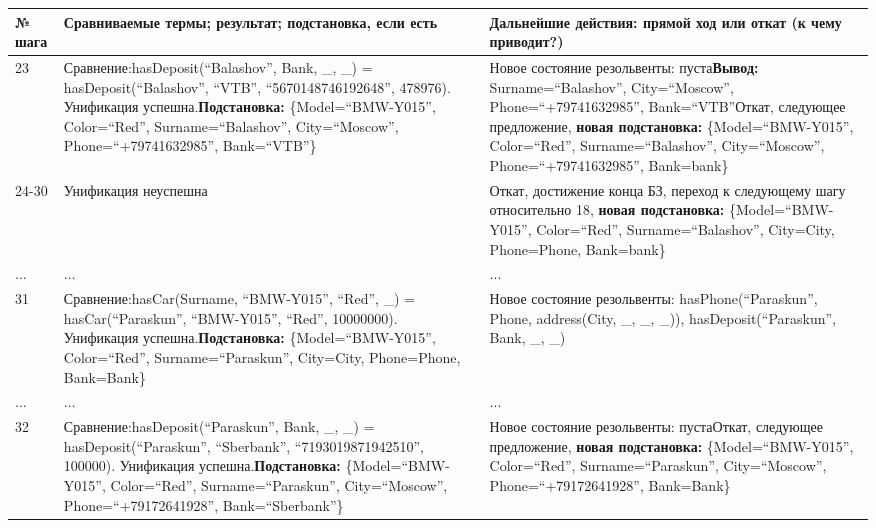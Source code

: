 \documentclass[14pt,a4paper]{scrreprt}
\begin{document}
\begin{enumerate}
\begin{table}[H]
	\centering
	\begin{tabular}{|p{1.2cm\small}|p{9cm\small}|p{5cm\small}|}
		\hline
		№ шага & Сравниваемые термы; результат; подстановка, если есть & Дальнейшие действия: прямой ход или откат (к чему приводит?)\\
		\hline
		23 & Сравнение:\linebreak hasDeposit(``Balashov'', Bank, \_, \_) = hasDeposit(``Balashov'', ``VTB'', ``5670148746192648'', 478976). Унификация успешна.\linebreak \textbf{Подстановка:} \{Model=``BMW-Y015'', Color=``Red'', Surname=``Balashov'', City=``Moscow'', Phone=``+79741632985'', Bank=``VTB''\} & Новое состояние резольвенты: пуста\linebreak \textbf{Вывод:} Surname=``Balashov'', City=``Moscow'', Phone=``+79741632985'', Bank=``VTB''\linebreak Откат, следующее предложение, \textbf{новая подстановка:} \{Model=``BMW-Y015'', Color=``Red'', Surname=``Balashov'', City=``Moscow'', Phone=``+79741632985'', Bank=bank\}\\
		\hline
		24-30 & Унификация неуспешна & Откат, достижение конца БЗ, переход к следующему шагу относительно 18, \textbf{новая подстановка:} \{Model=``BMW-Y015'', Color=``Red'', Surname=``Balashov'', City=City, Phone=Phone, Bank=bank\}\\
		\hline
		... & ... & ...\\
		\hline
		31 & Сравнение:\linebreak hasCar(Surname, ``BMW-Y015'', ``Red'', \_) = hasCar(``Paraskun'', ``BMW-Y015'', ``Red'', 10000000). Унификация успешна.\linebreak \textbf{Подстановка:} \{Model=``BMW-Y015'', Color=``Red'', Surname=``Paraskun'', City=City, Phone=Phone, Bank=Bank\} & Новое состояние резольвенты: hasPhone(``Paraskun'', Phone, address(City, \_, \_, \_)), hasDeposit(``Paraskun'', Bank, \_, \_)\\
		\hline
		... & ... & ...\\
		\hline
		32 & Сравнение:\linebreak hasDeposit(``Paraskun'', Bank, \_, \_) = hasDeposit(``Paraskun'', ``Sberbank'', ``7193019871942510'', 100000). Унификация успешна.\linebreak \textbf{Подстановка:} \{Model=``BMW-Y015'', Color=``Red'', Surname=``Paraskun'', City=``Moscow'', Phone=``+79172641928'', Bank=``Sberbank''\} & Новое состояние резольвенты: пуста\linebreak Откат, следующее предложение, \textbf{новая подстановка:} \{Model=``BMW-Y015'', Color=``Red'', Surname=``Paraskun'', City=``Moscow'', Phone=``+79172641928'', Bank=Bank\}\\
		\hline
	\end{tabular}
\end{table}


\end{enumerate}
\end{document}
